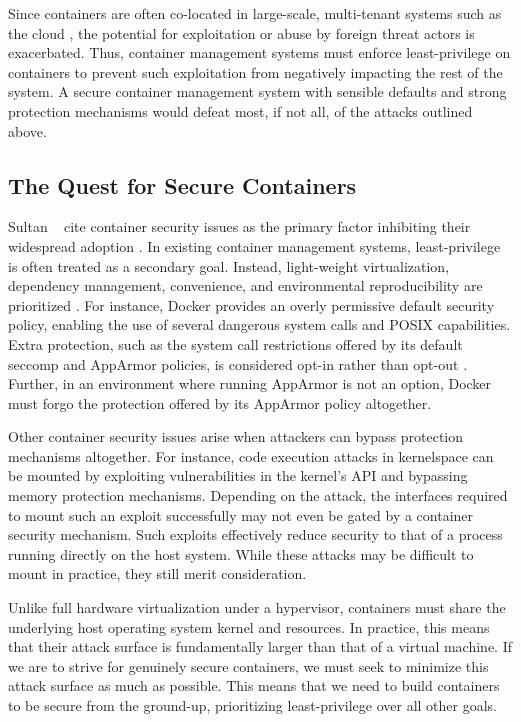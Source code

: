 Since containers are often co-located in large-scale, multi-tenant systems such as the cloud \cite{sultan2019_container_security}, the potential for exploitation or abuse by foreign threat actors is exacerbated. Thus, container management systems must enforce least-privilege on containers to prevent such exploitation from negatively impacting the rest of the system. A secure container management system with sensible defaults and strong protection mechanisms would defeat most, if not all, of the attacks outlined above.

\subsection{The Quest for Secure Containers}%
\label{sub:secure_containers}

Sultan \etal~ cite container security issues as the primary factor inhibiting their widespread adoption \cite{sultan2019_container_security}. In existing container management systems, least-privilege is often treated as a secondary goal. Instead, light-weight virtualization, dependency management, convenience, and environmental reproducibility are prioritized . For instance, Docker  \cite{docker} provides an overly permissive default security policy, enabling the use of several dangerous system calls and POSIX capabilities. Extra protection, such as the system call restrictions offered by its default seccomp and AppArmor policies, is considered opt-in rather than opt-out \cite{docker}. Further, in an environment where running AppArmor is not an option, Docker must forgo the protection offered by its AppArmor policy altogether.

Other container security issues arise when attackers can bypass protection mechanisms altogether. For instance, code execution attacks in kernelspace can be mounted by exploiting vulnerabilities in the kernel's API and bypassing memory protection mechanisms. Depending on the attack, the interfaces required to mount such an exploit successfully may not even be gated by a container security mechanism. Such exploits effectively reduce security to that of a process running directly on the host system. While these attacks may be difficult to mount in practice, they still merit consideration.

Unlike full hardware virtualization under a hypervisor, containers must share the underlying host operating system kernel and resources. In practice, this means that their attack surface is fundamentally larger than that of a virtual machine. If we are to strive for genuinely secure containers, we must seek to minimize this attack surface as much as possible. This means that we need to build containers to be secure from the ground-up, prioritizing least-privilege over all other goals.
